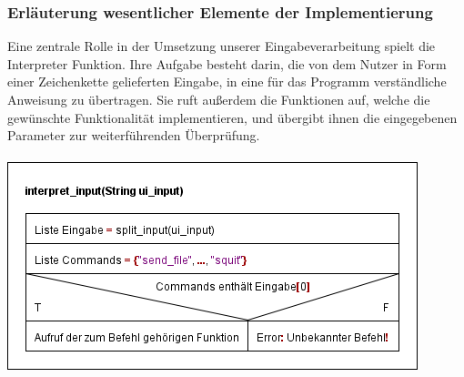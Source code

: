 \subsubsection{Erläuterung wesentlicher Elemente der Implementierung}
Eine zentrale Rolle in der Umsetzung unserer Eingabeverarbeitung spielt die Interpreter Funktion. Ihre Aufgabe besteht darin, die von dem Nutzer in Form einer Zeichenkette gelieferten Eingabe, in eine für das Programm verständliche Anweisung zu übertragen. Sie ruft außerdem die Funktionen auf, welche die gewünschte Funktionalität implementieren, und übergibt ihnen die eingegebenen Parameter zur weiterführenden Überprüfung.\\\hfill\\
\includegraphics[scale=0.75]{templ}\\
